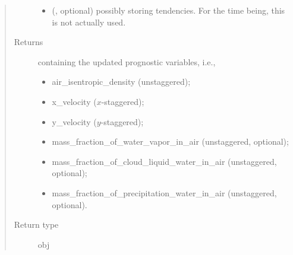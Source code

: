 \documentclass[letterpaper,10pt,english]{sphinxmanual}
\begin{document}
\begin{fulllineitems}
\begin{fulllineitems}
\begin{quote}
\begin{description}
\begin{itemize}
\item {} 
 (, optional) \textendash{} {\hyperref[\detokenize{api:tasmania.storages.grid_data.GridData}]{}} possibly storing tendencies.
For the time being, this is not actually used.

\end{itemize}

\item[{Returns}] \leavevmode

{\hyperref[\detokenize{api:tasmania.storages.state_isentropic.StateIsentropic}]{}} containing the updated prognostic variables, i.e.,
\begin{itemize}
\item {} 
air\_isentropic\_density (unstaggered);

\item {} 
x\_velocity (\(x\)-staggered);

\item {} 
y\_velocity (\(y\)-staggered);

\item {} 
mass\_fraction\_of\_water\_vapor\_in\_air (unstaggered, optional);

\item {} 
mass\_fraction\_of\_cloud\_liquid\_water\_in\_air (unstaggered, optional);

\item {} 
mass\_fraction\_of\_precipitation\_water\_in\_air (unstaggered, optional).

\end{itemize}


\item[{Return type}] \leavevmode
obj

\end{description}\end{quote}

\end{fulllineitems}


\end{fulllineitems}

\end{document}
